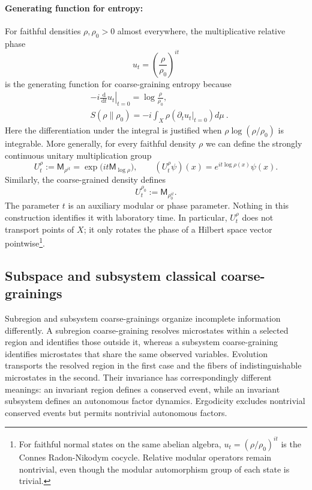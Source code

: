 \documentclass[a4paper,11pt]{article}
\theoremstyle{definition}
\newcommand{\dd}{\,\mathrm{d}}
\newcommand{\Mop}{\mathsf{M}}
\newcommand{\nn}{\nonumber}
\begin{document}
\paragraph{Generating function for entropy:} For faithful densities $\rho,\rho_0>0$ almost everywhere, the multiplicative relative phase 
\[
u_t
=
\left(\frac{\rho}{\rho_0}\right)^{it}
\]
is the generating function for coarse-graining entropy because 
\begin{align}
&-i\left.\frac{\dd}{\dd t}u_t\right|_{t=0}
=
\log\frac{\rho}{\rho_0},\nn\\
&S(\rho\|\rho_0)=-i \int_X \rho (\partial_t u_t\big|_{t=0})d\mu\ .
\end{align}
Here the differentiation under the integral is justified when $\rho\log(\rho/\rho_0)$ is integrable. More generally, for every faithful density $\rho$ we can define the strongly continuous unitary multiplication group
\[
  U_t^\rho:=\Mop_{\rho^{it}}
  =\exp\!\bigl(it\Mop_{\log\rho}\bigr),
  \qquad
  (U_t^\rho\psi)(x)=e^{it\log\rho(x)}\psi(x).
\]
Similarly, the coarse-grained density defines
\[
  U_t^{\rho_0}:=\Mop_{\rho_0^{it}}.
\]
The parameter $t$ is an auxiliary modular or phase parameter. Nothing in this construction identifies it with laboratory time. In particular, $U_t^\rho$ does not transport points of $X$; it only rotates the phase of a Hilbert space vector pointwise\footnote{For faithful normal states on the same abelian algebra, $u_t=(\rho/\rho_0)^{it}$ is the Connes Radon-Nikodym cocycle. Relative modular operators remain nontrivial, even though the modular automorphism group of each state is trivial.}.

\subsection{Subspace and subsystem classical coarse-grainings}
\label{subsec:classical-region-subsystem}

Subregion and subsystem coarse-grainings organize incomplete information differently. A subregion coarse-graining resolves microstates within a selected region and identifies those outside it, whereas a subsystem coarse-graining identifies microstates that share the same observed variables. Evolution transports the resolved region in the first case and the fibers of indistinguishable microstates in the second. Their invariance has correspondingly different meanings: an invariant region defines a conserved event, while an invariant subsystem defines an autonomous factor dynamics. Ergodicity excludes nontrivial conserved events but permits nontrivial autonomous factors.
\end{document}
